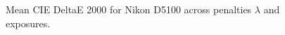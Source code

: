 \begin{figure}
    \centering
    \caption{Mean CIE DeltaE 2000 for Nikon D5100 across penalties $\lambda$ and exposures.}
    \label{fig:nikonexposure}
\end{figure}

